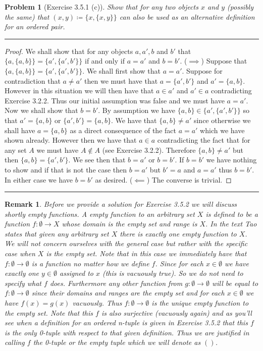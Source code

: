 \documentclass{article}
\newcommand{\lined}{\noindent\rule{\textwidth}{1pt}}
\newtheorem*{problem}{Problem}
\newtheorem*{remark}{Remark}
\begin{document}
	\begin{problem}[Exercise 3.5.1 (c)]
		Show that for any two objects $x$ and $y$ (possibly the same) that $(x,y) \coloneqq \{x,\{x,y\}\}$ can also be used as
		an alternative definition for an ordered pair.
	\end{problem}

	\lined
	\begin{proof}
		We shall show that for any objects $a,a',b$ and $b'$ that $\{a,\{a,b\}\} = \{a',\{a',b'\}\}$ if and only if $a = a'$ and
		$b = b'$. ($\implies$) Suppose that  $\{a,\{a,b\}\} = \{a',\{a',b'\}\}$. We shall first show that $a = a'$. Suppose for contradiction
		that $a \neq a'$ then we must have that $a = \{a',b'\}$ and $a' = \{a,b\}$. However in this situation we will then have that
		$a \in a'$ and $a' \in a$  contradicting Exercise 3.2.2. Thus our initial assumption was false and we must have $a = a'$.  Now we shall show that $b = b'$. By assumption we have $\{a,b\} \in \{a',\{a',b'\}\}$ so that $a' = \{a,b\}$ or $\{a',b'\} = \{a,b\}$. We have that $\{a,b\} \neq a'$ since otherwise we shall have $a = \{a,b\}$ as a direct consequence of the fact $a = a'$ which we have shown already. However then we have that $a \in a$ contradicting the fact that for any set $A$ we must have $A \notin A$ (see Exercise 3.2.2). Therefore $\{a,b\} \neq a'$ but then $\{a,b\} = \{a',b'\}$. We see then that $b = a'$ or $b = b'$. If $b = b'$ we have nothing to show and if that is not the case then $b = a'$ but $b' = a$ and $a = a'$ thus $b = b'$. In either case we have $b = b'$ as desired.
		\linebreak
		\noindent ($\impliedby$) The converse is trivial. 
	\end{proof}
	\lined
	
	\newpage
	
	\begin{remark}
		Before we provide a solution for Exercise 3.5.2 we will discuss shortly empty functions. A empty function to an arbitrary set $X$ is defined to be a function $f:\emptyset \rightarrow X$ whose domain is the empty set and range is $X$. In the text Tao states that given any arbitrary set $X$ there is exactly one empty function to $X$. We will not concern ourselves with the general case but rather with the specific case when $X$ is the empty set. Note that in this case we immediately have that $f:\emptyset \rightarrow \emptyset$ is a function no matter how we define $f$. Since for each $x \in \emptyset$ we have exactly one $y \in \emptyset$ assigned to $x$ (this is vacuously true). So we do not need to specify what $f$ does. Furthermore any other function from $g:\emptyset \rightarrow \emptyset$ will be equal to $f:\emptyset \rightarrow \emptyset$ since their domains and ranges are the empty set and for each $x \in \emptyset$ we have $f(x) = g(x)$ vacuously. Thus $f:\emptyset \rightarrow \emptyset$ is the unique empty function to the empty set. Note that this $f$ is also surjective (vacuously again) and as you'll see when a definition for an ordered n-tuple is given in Exercise 3.5.2 that this $f$ is the only 0-tuple with respect to that given definition. Thus we are justified in calling $f$ the 0-tuple or the empty tuple which we will denote as $( )$.
	\end{remark}
\end{document}
